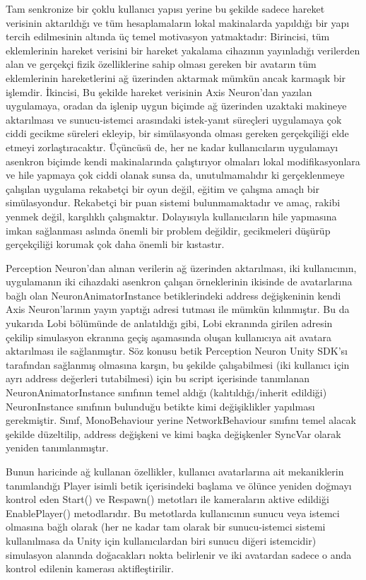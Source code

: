 \documentclass[a4paper, 12pt, titlepage]{article}
\begin{document}
Tam senkronize bir çoklu kullanıcı yapısı yerine bu şekilde sadece hareket verisinin aktarıldığı ve
tüm hesaplamaların lokal makinalarda yapıldığı bir yapı tercih edilmesinin altında üç temel
motivasyon yatmaktadır: Birincisi, tüm eklemlerinin hareket verisini bir hareket yakalama cihazının
yayınladığı verilerden alan ve gerçekçi fizik özelliklerine sahip olması gereken bir avatarın tüm
eklemlerinin hareketlerini ağ üzerinden aktarmak mümkün ancak karmaşık bir işlemdir. İkincisi, Bu
şekilde hareket verisinin Axis Neuron’dan yazılan uygulamaya, oradan da işlenip uygun biçimde ağ
üzerinden uzaktaki makineye aktarılması ve sunucu-istemci arasındaki istek-yanıt süreçleri
uygulamaya çok ciddi gecikme süreleri ekleyip, bir simülasyonda olması gereken gerçekçiliği elde
etmeyi zorlaştıracaktır. Üçüncüsü de, her ne kadar kullanıcıların uygulamayı asenkron biçimde kendi
makinalarında çalıştırıyor olmaları lokal modifikasyonlara ve hile yapmaya çok ciddi olanak sunsa
da, unutulmamalıdır ki gerçeklenmeye çalışılan uygulama rekabetçi bir oyun değil, eğitim ve çalışma
amaçlı bir simülasyondur. Rekabetçi bir puan sistemi bulunmamaktadır ve amaç, rakibi yenmek değil,
karşılıklı çalışmaktır. Dolayısıyla kullanıcıların hile yapmasına imkan sağlanması aslında önemli
bir problem değildir, gecikmeleri düşürüp gerçekçiliği korumak çok daha önemli bir kıstastır.

Perception Neuron’dan alınan verilerin ağ üzerinden aktarılması, iki kullanıcının, uygulamanın iki
cihazdaki asenkron çalışan örneklerinin ikisinde de avatarlarına bağlı olan NeuronAnimatorInstance
betiklerindeki address değişkeninin kendi Axis Neuron’larının yayın yaptığı adresi tutması ile
mümkün kılınmıştır. Bu da yukarıda Lobi bölümünde de anlatıldığı gibi, Lobi ekranında girilen
adresin çekilip simulasyon ekranına geçiş aşamasında oluşan kullanıcıya ait avatara aktarılması ile
sağlanmıştır. Söz konusu betik Perception Neuron Unity SDK’sı tarafından sağlanmış olmasına karşın,
bu şekilde çalışabilmesi (iki kullanıcı için ayrı address değerleri tutabilmesi) için bu script
içerisinde tanımlanan NeuronAnimatorInstance sınıfının temel aldığı (kalıtıldığı/inherit edildiği)
NeuronInstance sınıfının bulunduğu betikte kimi değişiklikler yapılması gerekmiştir. Sınıf,
MonoBehaviour yerine NetworkBehaviour sınıfını temel alacak şekilde düzeltilip, address değişkeni
ve kimi başka değişkenler SyncVar olarak yeniden tanımlanmıştır.

Bunun haricinde ağ kullanan özellikler, kullanıcı avatarlarına ait mekaniklerin tanımlandığı Player
isimli betik içerisindeki başlama ve ölünce yeniden doğmayı kontrol eden Start() ve Respawn()
metotları ile kameraların aktive edildiği EnablePlayer() metodlarıdır. Bu metotlarda kullanıcının
sunucu veya istemci olmasına bağlı olarak (her ne kadar tam olarak bir sunucu-istemci sistemi
kullanılmasa da Unity için kullanıcılardan biri sunucu diğeri istemcidir) simulasyon alanında
doğacakları nokta belirlenir ve iki avatardan sadece o anda kontrol edilenin kamerası
aktifleştirilir.
\end{document}
